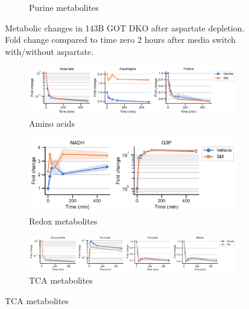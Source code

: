 \begin{figure}[!ht]
\begin{subfigure}[b]{0.3\textwidth}
         \caption{Purine metabolites}
         \label{fig:sapp:GOT_DKO_Asp_depl:143B_DKO_pur}
     \end{subfigure}
     \hfill
        \caption[Metabolic changes in 143B after Asp depl.]{
        Metabolic changes in 143B GOT DKO after aspartate depletion.
        Fold change compared to time zero 2 hours after media switch with/without aspartate.
        }
        \label{fig:sapp:GOT_DKO_Asp_depl:143B_DKO_metab}
\end{figure}


\begin{figure}[!ht]
     \centering
     \begin{subfigure}[b]{0.68\textwidth}
         \includegraphics[width=\textwidth]{figures/sapp/GOT_DKO_Asp_depl/HT1080_DKO_AA.pdf}
         \caption{Amino acids}
         \label{fig:sapp:GOT_DKO_Asp_depl:HT1080_DKO_AA}
     \end{subfigure}
     \hfill
     \begin{subfigure}[b]{0.45\textwidth}
         \includegraphics[width=\textwidth]{figures/sapp/GOT_DKO_Asp_depl/HT1080_DKO_rd.pdf}
         \caption{Redox metabolites}
         \label{fig:sapp:GOT_DKO_Asp_depl:HT1080_DKO_rd}
     \end{subfigure}
     \hfill
     \begin{subfigure}[b]{0.9\textwidth}
         \includegraphics[width=\textwidth]{figures/sapp/GOT_DKO_Asp_depl/HT1080_DKO_tca.pdf}
         \caption{TCA metabolites}

\end{subfigure}
\end{figure}
